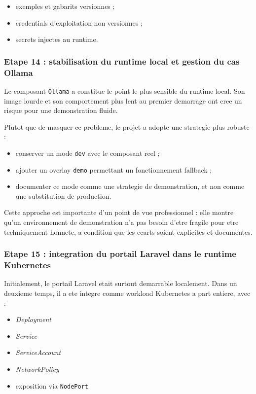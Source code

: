 \begin{itemize}
  \item exemples et gabarits versionnes ;
  \item credentials d'exploitation non versionnes ;
  \item secrets injectes au runtime.
\end{itemize}

\subsubsection{Etape 14 : stabilisation du runtime local et gestion du cas Ollama}

Le composant \texttt{Ollama} a constitue le point le plus sensible du runtime local. Son image lourde et son comportement plus lent au premier demarrage ont cree un risque pour une demonstration fluide.

Plutot que de masquer ce probleme, le projet a adopte une strategie plus robuste :

\begin{itemize}
  \item conserver un mode \texttt{dev} avec le composant reel ;
  \item ajouter un overlay \texttt{demo} permettant un fonctionnement fallback ;
  \item documenter ce mode comme une strategie de demonstration, et non comme une substitution de production.
\end{itemize}

Cette approche est importante d'un point de vue professionnel : elle montre qu'un environnement de demonstration n'a pas besoin d'etre fragile pour etre techniquement honnete, a condition que les ecarts soient explicites et documentes.

\subsubsection{Etape 15 : integration du portail Laravel dans le runtime Kubernetes}

Initialement, le portail Laravel etait surtout demarrable localement. Dans un deuxieme temps, il a ete integre comme workload Kubernetes a part entiere, avec :

\begin{itemize}
  \item \textit{Deployment}
  \item \textit{Service}
  \item \textit{ServiceAccount}
  \item \textit{NetworkPolicy}
  \item exposition via \texttt{NodePort}
\end{itemize}

